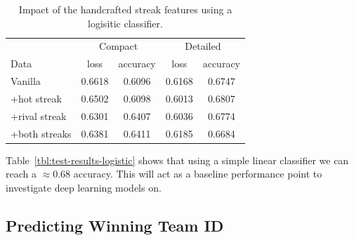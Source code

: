 \documentclass{article} %
\begin{document}
\begin{table}
\centering
  \begin{tabular}{|l|c|c|c|c|}
  \hline
   & \multicolumn{2}{|c|}{Compact} & \multicolumn{2}{|c|}{Detailed}\\
  Data & loss & accuracy & loss & accuracy\\
  \hline
  Vanilla       & 0.6618 & 0.6096 & 0.6168 & 0.6747\\ 
  +hot streak   & 0.6502 & 0.6098 & 0.6013 & 0.6807\\
  +rival streak & 0.6301 & 0.6407 & 0.6036 & 0.6774\\
  +both streaks & 0.6381 & 0.6411 & 0.6185 & 0.6684\\
  \hline
  \end{tabular}
  \caption{Impact of the handcrafted streak features using a logisitic classifier.}
\end{table}
\label{tbl:test-results-logistic}

Table~\ref{tbl:test-results-logistic} shows that using a simple linear classifier we can reach a $\approx 0.68$ accuracy.
This will act as a baseline performance point to investigate deep learning models on.



\subsection{Predicting Winning Team ID}
\label{sec:results-wteamid}
\end{document}
